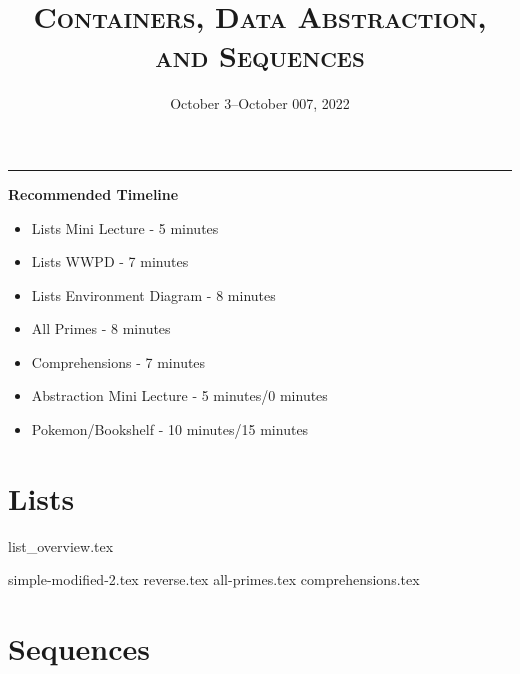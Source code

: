 \documentclass{exam}
\title{\textsc{Containers, Data Abstraction, and Sequences}}
\date{October 3--October 007, 2022}
\begin{document}
\maketitle
\rule{\textwidth}{0.15em}
\fontsize{12}{15}\selectfont


\begin{guide}
    \textbf{Recommended Timeline}
    \begin{itemize}
        \item Lists Mini Lecture - 5 minutes
        \item Lists WWPD - 7 minutes
        \item Lists Environment Diagram - 8 minutes
        \item All Primes - 8 minutes
        \item Comprehensions - 7 minutes
        \item Abstraction Mini Lecture - 5 minutes/0 minutes
        \item Pokemon/Bookshelf - 10 minutes/15 minutes
    \end{itemize}
\end{guide}

\section{Lists}
{list_overview.tex}
\begin{questions}
    {simple-modified-2.tex}
    {reverse.tex}
    \newpage %
    {all-primes.tex}
    {comprehensions.tex}
\end{questions}

\newpage
\section{Sequences}


\newpage
\end{document}
